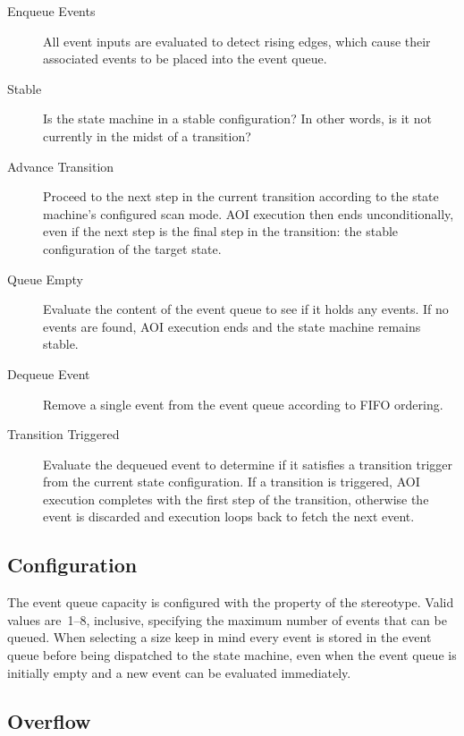 \begin{description}
  \item[Enqueue Events] All event inputs are evaluated to detect rising
    edges, which cause their associated events to be placed into the
    event queue.

  \item[Stable] Is the state machine in a stable configuration? In other
    words, is it not currently in the midst of a transition?

  \item[Advance Transition] Proceed to the next step in the current
    transition according to the state machine's configured scan mode.
    AOI execution then ends unconditionally, even if the next step is the
    final step in the transition: the stable configuration of the
    target state.

  \item[Queue Empty] Evaluate the content of the event queue to see if it
    holds any events. If no events are found, AOI execution ends and the
    state machine remains stable.

  \item[Dequeue Event] Remove a single event from the event queue according
    to FIFO ordering.

  \item[Transition Triggered] Evaluate the dequeued event to determine if it
    satisfies a transition trigger from the current state configuration.
    If a transition is triggered, AOI execution completes with the
    first step of the transition, otherwise the event is discarded and
    execution loops back to fetch the next event.
\end{description}




\subsection{Configuration}

The event queue capacity is configured with the
 property of the
 stereotype. Valid values are~1--8,
inclusive, specifying the maximum number of events that can be queued.
When selecting a size keep in mind every event is stored in
the event queue before being dispatched to the state machine,
even when the event queue is initially empty and a new event can be
evaluated immediately.


\subsection{Overflow}

